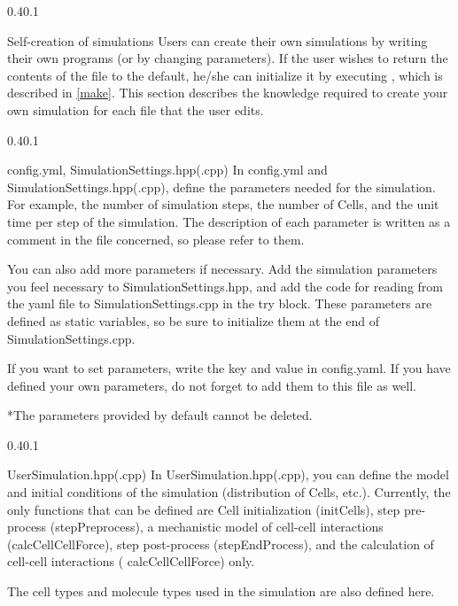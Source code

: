 \documentclass[vipdfmx,a4paper,11pt]{jsarticle}
\makeatletter
\renewcommand{\section}{%
  \@startsection{section}{1}{\z@}%
  {0.4\Cvs}{0.1\Cvs}%
  {\normalfont\large\headfont\raggedright}}
\renewcommand{\subsection}{%
  \@startsection{subsection}{1}{\z@}%
  {0.4\Cvs}{0.1\Cvs}%
  {\normalfont\large\headfont\raggedright}}
\makeatother
\begin{document}
\section{Self-creation of simulations}
Users can create their own simulations by writing their own programs (or by changing parameters).
If the user wishes to return the contents of the file to the default, he/she can initialize it by executing , which is described in \ref{make}.
This section describes the knowledge required to create your own simulation for each file that the user edits.

\subsection{config.yml, SimulationSettings.hpp(.cpp)}
In config.yml and SimulationSettings.hpp(.cpp), define the parameters needed for the simulation. For example, the number of simulation steps, the number of
Cells, and the unit time per step of the simulation.
The description of each parameter is written as a comment in the file concerned, so please refer to them.

You can also add more parameters if necessary.
Add the simulation parameters you feel necessary to SimulationSettings.hpp, and add the code for reading from the yaml file to SimulationSettings.cpp in the try block.
These parameters are defined as static variables, so be sure to initialize them at the end of SimulationSettings.cpp.

If you want to set parameters, write the key and value in config.yaml. If you have defined your own parameters, do not forget to add them to this file as well.

*The parameters provided by default cannot be deleted.

\subsection{UserSimulation.hpp(.cpp)}
In UserSimulation.hpp(.cpp), you can define the model and initial conditions of the simulation (distribution of Cells, etc.).
Currently, the only functions that can be defined are Cell initialization (initCells), step pre-process (stepPreprocess), a mechanistic model of cell-cell interactions (calcCellCellForce), step post-process (stepEndProcess), and the calculation of cell-cell interactions ( calcCellCellForce) only.

The cell types and molecule types used in the simulation are also defined here.
\end{document}
